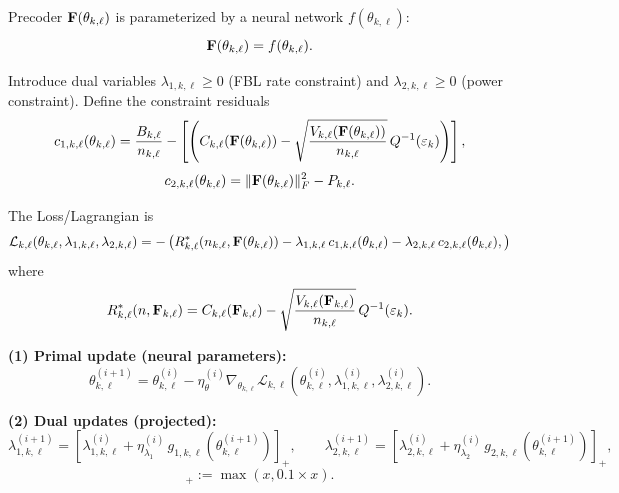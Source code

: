 \documentclass[a4paper, 12pt, onecolumn, journal, twoside, draftclsnofoot]{IEEEtran}
\begin{document}
Precoder ${\bf F}(\theta_{k,\ell})$ is parameterized by a neural network $f(\theta_{k,\ell})$:
\begin{equation*}
{\bf F}(\theta_{k,\ell}) = f(\theta_{k,\ell}).
\end{equation*}

Introduce dual variables $\lambda_{1,k,\ell}\ge 0$ (FBL rate constraint) and $\lambda_{2,k,\ell}\ge 0$ (power constraint). Define the constraint residuals
\begin{equation*}
c_{1,k,\ell}(\theta_{k,\ell})
 = 
\frac{B_{k,\ell}}{n_{k,\ell}}
-\left[
\left(
C_{k,\ell}({\bf F}(\theta_{k,\ell}))
-
\sqrt{\frac{V_{k,\ell}({\bf F}(\theta_{k,\ell}))}{n_{k,\ell}}}\,
Q^{-1}(\varepsilon_k)
\right) \right],
\end{equation*}
\begin{equation*}
c_{2,k,\ell}(\theta_{k,\ell})
=
\|{\bf F}(\theta_{k,\ell})\|_F^2 - P_{k,\ell}.
\end{equation*}

The Loss/Lagrangian is
\begin{equation*}
\mathcal{L}_{k,\ell}(\theta_{k,\ell},\lambda_{1,k,\ell},\lambda_{2,k,\ell})
= -\left(
R^*_{k,\ell}\!\left(n_{k,\ell},{\bf F}(\theta_{k,\ell})\right)
-\lambda_{1,k,\ell}\, c_{1,k,\ell}(\theta_{k,\ell})
-\lambda_{2,k,\ell}\, c_{2,k,\ell}(\theta_{k,\ell}),
 \right) \end{equation*}
where
\begin{equation*}
R^*_{k,\ell}(n,{\bf F}_{k, \ell})
=
C_{k,\ell}({\bf F}_{k, \ell})
-
\sqrt{\frac{V_{k,\ell}({\bf F}_{k, \ell})}{n_{k, \ell}}}\,Q^{-1}(\varepsilon_k).
\end{equation*}

\textbf{(1) Primal update (neural parameters):}
\begin{equation*}
\theta_{k,\ell}^{(i+1)}
=
\theta_{k,\ell}^{(i)}
-
\eta_{\theta}^{(i)}
\nabla_{\theta_{k,\ell}}
\mathcal{L}_{k,\ell}\!\left(
\theta_{k,\ell}^{(i)},\lambda_{1,k,\ell}^{(i)},\lambda_{2,k,\ell}^{(i)}
\right).
\end{equation*}

\textbf{(2) Dual updates (projected):}
\begin{equation*}
\lambda_{1,k,\ell}^{(i+1)}
=
\left[
\lambda_{1,k,\ell}^{(i)}
+
\eta_{\lambda_1}^{(i)}\, g_{1,k,\ell}\!\left(\theta_{k,\ell}^{(i+1)}\right)
\right]_+,
\qquad
\lambda_{2,k,\ell}^{(i+1)}
=
\left[
\lambda_{2,k,\ell}^{(i)}
+
\eta_{\lambda_2}^{(i)}\, g_{2,k,\ell}\!\left(\theta_{k,\ell}^{(i+1)}\right)
\right]_+,
\end{equation*}
\begin{equation*}
[x]_+ := \max(x,0.1 \times x).\end{equation*}
\end{document}
